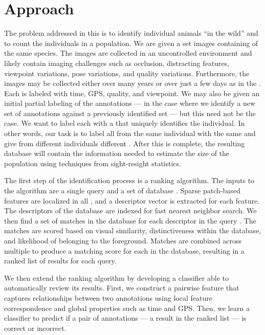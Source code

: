 \section{Approach}
    The problem addressed in this \thesis{} is to identify individual animals ``in the wild'' and to count the
      individuals in a population.
    We are given a set images containing \annots{} of the same species.
    The images are collected in an uncontrolled environment and likely contain imaging challenges such as
      occlusion, distracting features, viewpoint variations, pose variations, and quality variations.
    Furthermore, the images may be collected either over many years or over just a few days as in the \GZC{}.
    Each \annot{} is labeled with time, GPS, quality, and viewpoint.
    We may also be given an initial partial \name{} labeling of the annotations --- \eg{} in the case where we
      identify a new set of annotations against a previously identified set --- but this need not be the case.
    We want to label each \annot{} with a \glossterm{\name{}} that uniquely identifies the individual.
    In other words, our task is to label all \annots{} from the same individual with the same \name{} and give
      \annots{} from different individuals different \names{}.
    After this is complete, the resulting database will contain the information needed to estimate the size of
      the population using techniques from sight-resight statistics.

    The first step of the identification process is a ranking algorithm. The inputs to the algorithm are a single query
    \annot{} and a set of database \annots{}. Sparse patch-based features are localized in all \annots{}, and a
    descriptor vector is extracted for each feature. The descriptors of the database \annots{} are indexed for fast
    nearest neighbor search. We then find a set of matches in the database for each descriptor in the query \annot{}.
    The matches are scored based on visual similarity, distinctiveness within the database, and likelihood of belonging
    to the foreground. Matches are combined across multiple \exemplar{} \annots{} to produce a matching score for each
    \name{} in the database, resulting in a ranked list of results for each query.

    We then extend the ranking algorithm by developing a classifier able to automatically review its results.
    First, we construct a pairwise feature that captures relationships between two annotations using local
      feature correspondence and global properties such as time and GPS.
    Then, we learn a classifier to predict if a pair of annotations --- \ie{} a result in the ranked list --- is
      correct or incorrect.

